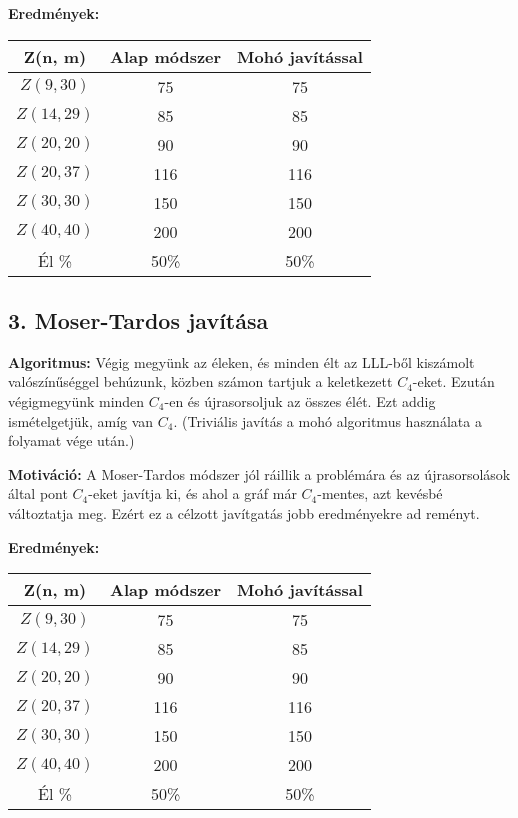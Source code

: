 \documentclass[12pt,a4paper]{article}
\begin{document}
\textbf{Eredmények:}
\begin{table}[H]
\centering
\begin{tabular}{|c|c|c|}
\hline
\textbf{Z(n, m)} & \textbf{Alap módszer} & \textbf{Mohó javítással} \\
\hline
$Z(9,30)$  & 75 & 75 \\
$Z(14, 29)$ & 85 & 85 \\
$Z(20, 20)$ & 90 & 90 \\
$Z(20, 37)$ & 116 & 116 \\
$Z(30, 30)$ & 150 & 150 \\
$Z(40, 40)$ & 200 & 200 \\
\hline
Él \% & 50\% & 50\% \\
\hline
\end{tabular}
\end{table}

\subsection*{3. Moser-Tardos javítása}

\textbf{Algoritmus:} Végig megyünk az éleken, és minden élt az LLL-ből kiszámolt valószínűséggel behúzunk, közben számon tartjuk a keletkezett $C_4$-eket. Ezután végigmegyünk minden $C_4$-en és újrasorsoljuk az összes élét. Ezt addig ismételgetjük, amíg van $C_4$. (Triviális javítás a mohó algoritmus használata a folyamat vége után.)

\textbf{Motiváció:} A Moser-Tardos módszer jól ráillik a problémára és az újrasorsolások által pont $C_4$-eket javítja ki, és ahol a gráf már $C_4$-mentes, azt kevésbé változtatja meg. Ezért ez a célzott javítgatás jobb eredményekre ad reményt.

\textbf{Eredmények:}
\begin{table}[H]
\centering
\begin{tabular}{|c|c|c|}
\hline
\textbf{Z(n, m)} & \textbf{Alap módszer} & \textbf{Mohó javítással} \\
\hline
$Z(9,30)$  & 75 & 75 \\
$Z(14, 29)$ & 85 & 85 \\
$Z(20, 20)$ & 90 & 90 \\
$Z(20, 37)$ & 116 & 116 \\
$Z(30, 30)$ & 150 & 150 \\
$Z(40, 40)$ & 200 & 200 \\
\hline
Él \% & 50\% & 50\% \\
\hline
\end{tabular}
\end{table}
\end{document}
